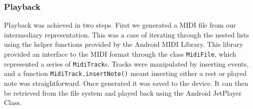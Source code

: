 \subsubsection{Playback}
Playback was achieved in two steps. First we generated a MIDI file from our intermediary representation. This was a case of iterating through the nested lists using the helper functions provided by the Android MIDI Library. This library provided an interface to the MIDI format through the class \verb!MidiFile!, which represented a series of \verb!MidiTrack!s. Tracks were manipulated by inserting events, and
a function \verb!MidiTrack.insertNote()! meant inserting either a rest or played note was straightforward. Once generated it was saved to the device. It can then be retrieved from the file system and played back using the Android JetPlayer Class.

